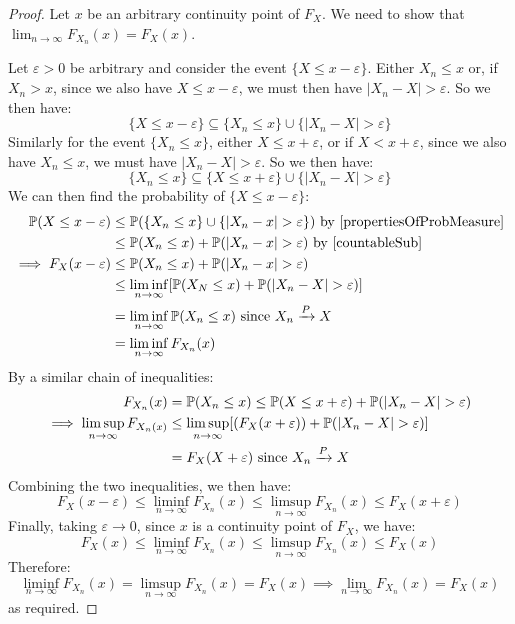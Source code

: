 \documentclass[../main.tex]{subfiles}
\begin{document}
\begin{proof}
  Let $x$ be an arbitrary continuity point of $F_X$.
  We need to show that $\lim_{n \to \infty} F_{X_n}(x) = F_X(x)$.

  Let $\varepsilon > 0$ be arbitrary and consider the event $\{X \leq x - \varepsilon\}$.
  Either $X_n \leq x$ or, if $X_n > x$, since we also have $X \leq x - \varepsilon$, we must then have $|X_n - X| > \varepsilon$.
  So we then have:
  \[
    \{X \leq x - \varepsilon\} \subseteq \{X_n \leq x\} \cup \{|X_n - X| > \varepsilon\}
  \]
  Similarly for the event $\{X_n \leq x\}$, either $X \leq x + \varepsilon$, or if $X < x + \varepsilon$, since we also have $X_n \leq x$, we must have $|X_n - X| > \varepsilon$.
  So we then have:
  \[
    \{X_n \leq x\} \subseteq \{X \leq x + \varepsilon\} \cup \{|X_n - X| > \varepsilon\}
  \]
  We can then find the probability of $\{X \leq x - \varepsilon\}$:
  \begin{align*}
    \P(X \leq x - \varepsilon) &\leq \P(\{X_n \leq x\} \cup \{|X_n - x| > \varepsilon\}) \text{ by \cref{propertiesOfProbMeasure}} \\
                               &\leq \P(X_n \leq x) + \P(|X_n - x| > \varepsilon) \text{ by \cref{countableSub}} \\
    \implies F_X(x - \varepsilon) &\leq \P(X_n \leq x) + \P(|X_n - x| > \varepsilon) \\
                                  &\leq \liminf_{n \to \infty} [\P(X_N \leq x) + \P(|X_n - X| > \varepsilon)] \\
                                  &= \liminf_{n \to \infty} \P(X_n \leq x) \text{ since $X_n \xrightarrow{P} X$} \\
                                  &= \liminf_{n \to \infty} F_{X_n}(x)
  \end{align*}
  By a similar chain of inequalities:
  \begin{align*}
    F_{X_n}(x) &= \P(X_n \leq x) \leq \P(X \leq x + \varepsilon) + \P(|X_n - X| > \varepsilon) \\
    \implies \limsup_{n \to \infty} F_{X_n(x)} &\leq \limsup_{n \to \infty} [(F_X(x + \varepsilon)) + \P(|X_n - X| > \varepsilon)] \\
                                               &= F_X(X + \varepsilon) \text{ since $X_n \xrightarrow{P} X$} \\
  \end{align*}
  Combining the two inequalities, we then have:
  \[
    F_X(x - \varepsilon) \leq \liminf_{n \to \infty} F_{X_n}(x) \leq \limsup_{n \to \infty} F_{X_n}(x) \leq F_{X}(x + \varepsilon)
  \]
  Finally, taking $\varepsilon \to 0$, since $x$ is a continuity point of $F_{X}$, we have:
  \[
    F_{X}(x) \leq \liminf_{n \to \infty} F_{X_n}(x) \leq \limsup_{n \to \infty} F_{X_n}(x) \leq F_{X}(x)
  \]
  Therefore:
  \[
    \liminf_{n \to \infty} F_{X_n}(x) = \limsup_{n \to \infty} F_{X_n}(x) = F_{X}(x) \implies \lim_{n \to \infty} F_{X_n}(x) = F_{X}(x)
  \]
  as required.
\end{proof}
\end{document}
